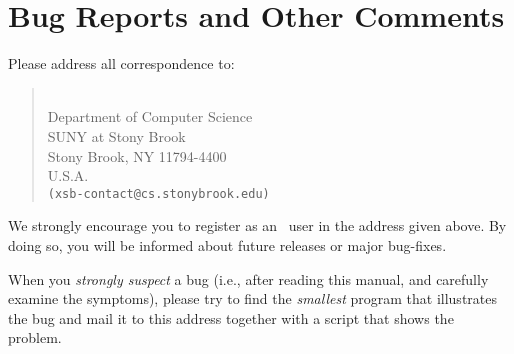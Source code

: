 \chapter{Bug Reports and Other Comments} \label{Contact}

Please address all correspondence to:

\begin{quote}
\ourprolog \\
Department of Computer Science \\
SUNY at Stony Brook \\
Stony Brook, NY 11794-4400 \\
U.S.A. \\
{\tt (xsb-contact@cs.stonybrook.edu)}
\end{quote}

We strongly encourage you to register as an \ourprolog\ user in the 
address given above.  By doing so, you will be informed about future 
releases or major bug-fixes.

When you {\em strongly suspect} a bug (i.e., after reading this manual, and
carefully examine the symptoms), please try to find the {\em smallest} program
that illustrates the bug and mail it to this address together with a script
that shows the problem.

